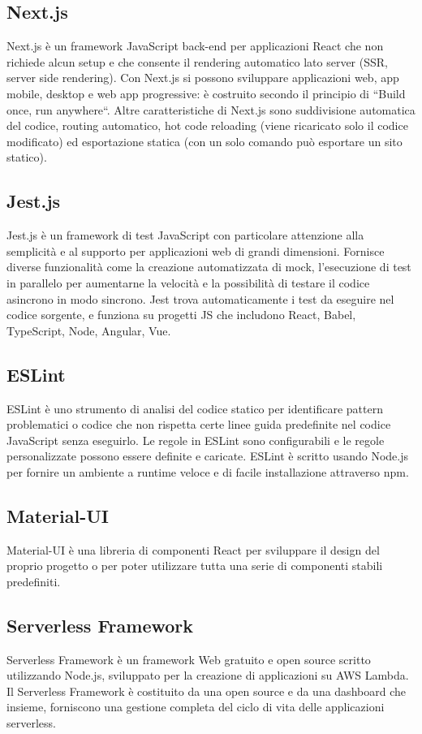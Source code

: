 \subsection{Next.js}
Next.js è un framework JavaScript back-end per applicazioni React che non richiede alcun setup e che consente il rendering automatico lato server (SSR, server side rendering).
Con Next.js si possono sviluppare applicazioni web, app mobile, desktop e web app progressive: è costruito secondo il principio di “Build once, run anywhere“.
Altre caratteristiche di Next.js sono suddivisione automatica del codice, routing automatico, hot code reloading (viene ricaricato solo il codice modificato) ed esportazione statica (con un solo comando può esportare un sito statico).
\subsection{Jest.js}
Jest.js è un framework di test JavaScript con particolare attenzione alla semplicità e al supporto per applicazioni web di grandi dimensioni.  Fornisce diverse funzionalità come la creazione automatizzata di mock, l'esecuzione di test in parallelo per aumentarne la velocità e la possibilità di testare il codice asincrono in modo sincrono. Jest trova automaticamente i test da eseguire nel codice sorgente, e funziona su progetti JS che includono React, Babel, TypeScript, Node, Angular, Vue.
\subsection{ESLint}
ESLint è uno strumento di analisi del codice statico per identificare pattern problematici o codice che non rispetta certe linee guida predefinite nel codice JavaScript senza eseguirlo. Le regole in ESLint sono configurabili e le regole personalizzate possono essere definite e caricate. ESLint è scritto usando Node.js per fornire un ambiente a runtime veloce e di facile installazione attraverso npm.
\subsection{Material-UI}
Material-UI è una libreria di componenti React per sviluppare il design del proprio progetto o per poter utilizzare tutta una serie di componenti stabili predefiniti.
\subsection{Serverless Framework}
Serverless Framework è un framework Web gratuito e open source scritto utilizzando Node.js, sviluppato per la creazione di applicazioni su AWS Lambda. Il Serverless Framework è costituito da una  open source e da una dashboard che insieme, forniscono una gestione completa del ciclo di vita delle applicazioni serverless.
